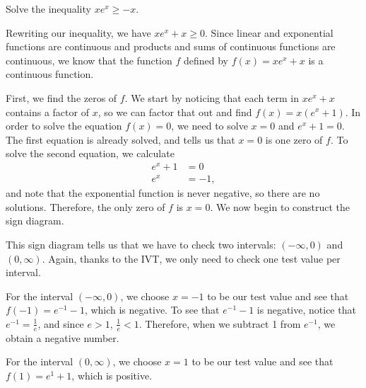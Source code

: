 \documentclass[noauthor, nooutcomes]{ximera}
\begin{document}
\begin{example}
Solve the inequality $xe^x  \ge -x$.
\end{example}
\begin{explanation}
Rewriting our inequality, we have $xe^x + x \ge 0$. Since linear and exponential functions are continuous and products and sums of continuous functions are continuous, we know that the function $f$ defined by $f(x) = xe^x + x$ is a continuous function.

First, we find the zeros of $f$. We start by noticing that each term in $xe^x + x$ contains a factor of $x$, so we can factor that out and find $f(x) = x(e^x + 1)$. In order to solve the equation $f(x) = 0$, we need to solve $x = 0$ and $e^x + 1 = 0$. The first equation is already solved, and tells us that $x = 0$ is one zero of $f$. To solve the second equation, we calculate
\begin{align*}
e^x + 1 & = 0\\
e^x & = -1,
\end{align*}
and note that the exponential function is never negative, so there are no solutions. Therefore, the only zero of $f$ is $x = 0$. We now begin to construct the sign diagram.

\begin{image}
\end{image}

This sign diagram tells us that we have to check two intervals: $\left(-\infty, 0\right)$ and $(0, \infty)$. Again, thanks to the IVT, we only need to check one test value per interval.

For the interval $\left(-\infty, 0\right)$, we choose $x = -1$ to be our test value and see that $f(-1) = e^{-1} - 1$, which is negative. To see that $e^{-1} - 1$ is negative, notice that $e^{-1} = \frac{1}{e}$, and since $e > 1$, $\frac{1}{e} < 1$. Therefore, when we subtract 1 from $e^{-1}$, we obtain a negative number. 

For the interval $\left(0, \infty\right)$, we choose $x = 1$ to be our test value and see that $f(1) = e^1 + 1$, which is positive.


\end{explanation}
\end{document}
